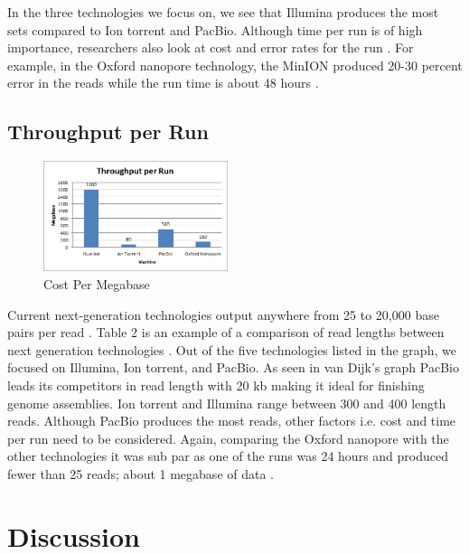 \documentclass[12pt,letterpaper]{report}
\begin{document}
In the three technologies we focus on, we see that Illumina produces the most sets compared to Ion torrent and PacBio. Although time per run is of high importance, researchers also look at cost and error rates for the run \cite{van_Dijk}. For example, in the Oxford nanopore technology, the MinION produced 20-30 percent error in the reads while the run time is about 48 hours \cite{karownotready}.

\subsection{Throughput per Run}

\begin{figure}
\vspace{-20pt}
  \begin{center}
    \includegraphics[width=0.48\textwidth]{throughput_per_run.png}
  \end{center}
  \vspace{-20pt}
  \caption{Cost Per Megabase}
  \vspace{-10pt}
  \label{fig:throughput_per_run}
\end{figure}

Current next-generation technologies output anywhere from 25 to 20,000 base pairs per read \cite{Shendure}. Table 2 is an example of a comparison of read lengths between next generation technologies \cite{van_Dijk}. Out of the five technologies listed in the graph, we focused on Illumina, Ion torrent, and PacBio. As seen in van Dijk's graph PacBio leads its competitors in read length with 20 kb making it ideal for finishing genome assemblies. Ion torrent and Illumina range between 300 and 400 length reads. Although PacBio produces the most reads, other factors i.e. cost and time per run need to be considered. Again, comparing the Oxford nanopore with the other technologies it was sub par as one of the runs was 24 hours and produced fewer than 25 reads; about 1 megabase of data \cite{karownotready}.  

\section{Discussion}
\end{document}
